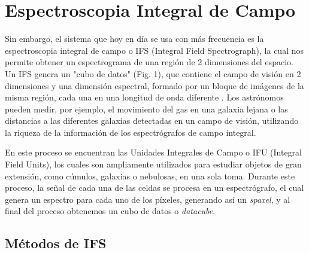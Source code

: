 \documentclass[9pt,twocolumn,a4paper]{opticajnl}
\begin{document}
\section*{Espectroscopia Integral de Campo}
Sin embargo, el sistema que hoy en día se usa con más frecuencia es la espectroscopia integral de campo o IFS (Integral Field Spectrograph), la cual nos permite obtener un espectrograma de una región de 2 dimensiones del espacio. Un IFS genera un "cubo de datos" (Fig. 1), que contiene el campo de visión en 2 dimensiones y una dimensión espectral, formado por un bloque de imágenes de la misma región, cada una en una longitud de onda diferente \cite{UW-Madison-IFS}. Los astrónomos pueden medir, por ejemplo, el movimiento del gas en una galaxia lejana o las distancias a las diferentes galaxias detectadas en un campo de visión, utilizando la riqueza de la información de los espectrógrafos de campo integral.

En este proceso se encuentran las Unidades Integrales de Campo o IFU (Integral Field Units), los cuales son ampliamente utilizados para estudiar objetos de gran extensión, como cúmulos, galaxias o nebulosas, en una sola toma. Durante este proceso, la señal de cada una de las celdas se procesa en un espectrógrafo, el cual genera un espectro para cada uno de los píxeles, generando así un \textit{spaxel}, y al final del proceso obtenemos un cubo de datos o \textit{datacube}.

\subsection*{Métodos de IFS}
\end{document}
